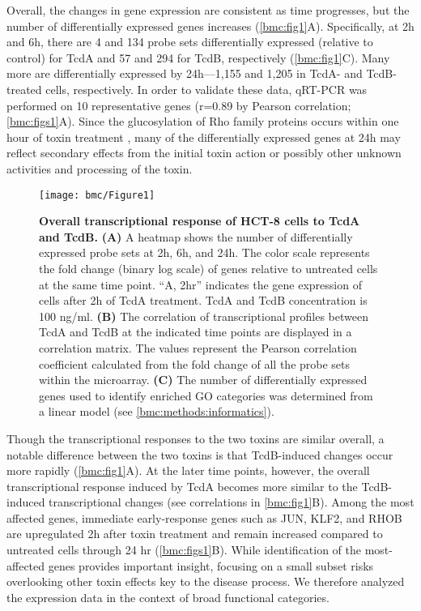Overall, the changes in gene expression are consistent as 
time progresses, but the number of differentially expressed 
genes increases (\autoref{bmc:fig1}A). Specifically, at 2h 
and 6h, there are 4 and 134 probe sets differentially 
expressed (relative to control) for TcdA and 57 and 294 for 
TcdB, respectively (\autoref{bmc:fig1}C).  Many more are 
differentially expressed by 24h—1,155 and 1,205 in TcdA- and 
TcdB-treated cells, respectively. In order to validate these 
data, qRT-PCR was performed on 10 representative genes 
(r=0.89 by Pearson correlation; \autoref{bmc:figs1}A). Since 
the glucosylation of Rho family proteins occurs within one hour 
of toxin treatment \cite{ChavesOlarte:1997cs}, many of the 
differentially expressed genes at 24h may reflect secondary 
effects from the initial toxin action or possibly other unknown 
activities and processing of the toxin.

\begin{figure}[h!]
  \centering
  \texttt{[image: bmc/Figure1]}
  \caption[Overall transcriptional response of HCT-8 
  cells to TcdA and TcdB]{
       \textbf{Overall transcriptional response of 
       HCT-8 cells to TcdA and TcdB.}
       \textbf{(A)} A heatmap shows the number of differentially 
       expressed probe sets at 2h, 6h, and 24h. The color scale 
       represents the fold change (binary log scale) of genes 
       relative to untreated cells at the same time point. 
       ``A, 2hr'' indicates the gene expression of cells 
       after 2h of TcdA treatment. TcdA and TcdB concentration 
       is 100 ng/ml.
       \textbf{(B)} The correlation of transcriptional 
       profiles between TcdA and TcdB at the indicated 
       time points are displayed in a correlation matrix. 
       The values represent the Pearson correlation 
       coefficient calculated from the fold change of 
       all the probe sets within the microarray.
       \textbf{(C)} The number of differentially expressed 
       genes used to identify enriched GO categories was 
       determined from a linear model 
       (see \ref{bmc:methods:informatics}).
}
  \label{bmc:fig1}
\end{figure}

Though the transcriptional responses to the two toxins 
are similar overall, a notable difference between the 
two toxins is that TcdB-induced changes occur more 
rapidly (\autoref{bmc:fig1}A). At the later time points, 
however, the overall transcriptional response induced by 
TcdA becomes more similar to the TcdB-induced transcriptional 
changes (see correlations in \autoref{bmc:fig1}B). Among 
the most affected genes, immediate early-response genes 
such as JUN, KLF2, and RHOB are upregulated 2h after toxin 
treatment and remain increased compared to untreated cells 
through 24 hr (\autoref{bmc:figs1}B). While identification 
of the most-affected genes provides important insight, 
focusing on a small subset risks overlooking other toxin 
effects key to the disease process. We therefore analyzed 
the expression data in the context of broad functional categories.

